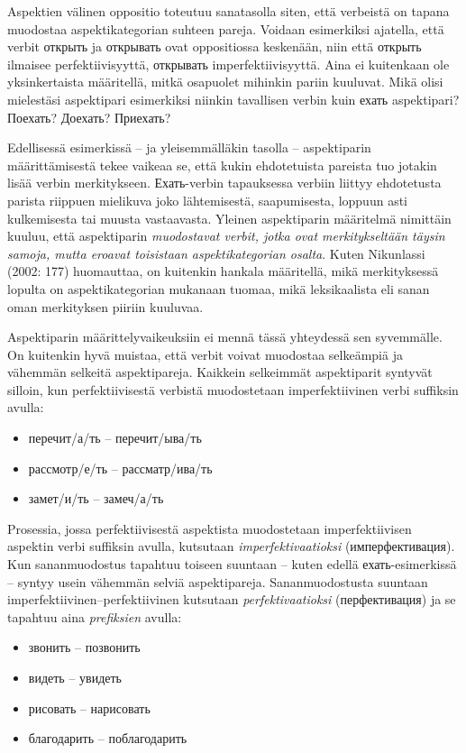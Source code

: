 \documentclass[]{scrartcl}
\providecommand{\tightlist}{%
  \setlength{\itemsep}{0pt}\setlength{\parskip}{0pt}}
\begin{document}
Aspektien välinen oppositio toteutuu sanatasolla siten, että verbeistä
on tapana muodostaa aspektikategorian suhteen pareja. Voidaan
esimerkiksi ajatella, että verbit открыть ja открывать ovat oppositiossa
keskenään, niin että открыть ilmaisee perfektiivisyyttä, открывать
imperfektiivisyyttä. Aina ei kuitenkaan ole yksinkertaista määritellä,
mitkä osapuolet mihinkin pariin kuuluvat. Mikä olisi mielestäsi
aspektipari esimerkiksi niinkin tavallisen verbin kuin ехать
aspektipari? Поехать? Доехать? Приехать?

Edellisessä esimerkissä -- ja yleisemmälläkin tasolla -- aspektiparin
määrittämisestä tekee vaikeaa se, että kukin ehdotetuista pareista tuo
jotakin lisää verbin merkitykseen. Ехать-verbin tapauksessa verbiin
liittyy ehdotetusta parista riippuen mielikuva joko lähtemisestä,
saapumisesta, loppuun asti kulkemisesta tai muusta vastaavasta. Yleinen
aspektiparin määritelmä nimittäin kuuluu, että aspektiparin
\emph{muodostavat verbit, jotka ovat merkitykseltään täysin samoja,
mutta eroavat toisistaan aspektikategorian osalta}. Kuten Nikunlassi
(2002: 177) huomauttaa, on kuitenkin hankala määritellä, mikä
merkityksessä lopulta on aspektikategorian mukanaan tuomaa, mikä
leksikaalista eli sanan oman merkityksen piiriin kuuluvaa.

Aspektiparin määrittelyvaikeuksiin ei mennä tässä yhteydessä sen
syvemmälle. On kuitenkin hyvä muistaa, että verbit voivat muodostaa
selkeämpiä ja vähemmän selkeitä aspektipareja. Kaikkein selkeimmät
aspektiparit syntyvät silloin, kun perfektiivisestä verbistä
muodostetaan imperfektiivinen verbi suffiksin avulla:

\begin{itemize}
\tightlist
\item
  перечит/а/ть -- перечит/ыва/ть
\item
  рассмотр/е/ть -- рассматр/ива/ть
\item
  замет/и/ть -- замеч/а/ть
\end{itemize}

Prosessia, jossa perfektiivisestä aspektista muodostetaan
imperfektiivisen aspektin verbi suffiksin avulla, kutsutaan
\emph{imperfektivaatioksi} (имперфективация). Kun sananmuodostus
tapahtuu toiseen suuntaan -- kuten edellä ехать-esimerkissä -- syntyy
usein vähemmän selviä aspektipareja. Sananmuodostusta suuntaan
imperfektiivinen--perfektiivinen kutsutaan \emph{perfektivaatioksi}
(перфективация) ja se tapahtuu aina \emph{prefiksien} avulla:

\begin{itemize}
\tightlist
\item
  звонить -- позвонить
\item
  видеть -- увидеть
\item
  рисовать -- нарисовать
\item
  благодарить -- поблагодарить
\end{itemize}
\end{document}
